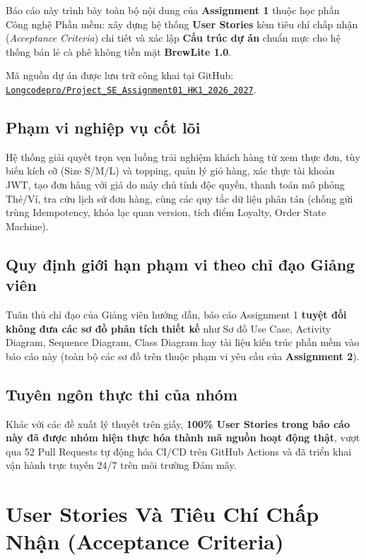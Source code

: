 \documentclass[12pt, a4paper]{article}
\newcommand{\fpath}[1]{\nolinkurl{#1}}
\begin{document}
Báo cáo này trình bày toàn bộ nội dung của \textbf{Assignment 1} thuộc học phần Công nghệ Phần mềm: xây dựng hệ thống \textbf{User Stories} kèm tiêu chí chấp nhận (\textit{Acceptance Criteria}) chi tiết và xác lập \textbf{Cấu trúc dự án} chuẩn mực cho hệ thống bán lẻ cà phê không tiền mặt \textbf{BrewLite 1.0}.

Mã nguồn dự án được lưu trữ công khai tại GitHub: \href{https://github.com/Longcodepro/Project_SE_Assignment01_HK1_2026_2027}{\fpath{Longcodepro/Project_SE_Assignment01_HK1_2026_2027}}.

\subsection{Phạm vi nghiệp vụ cốt lõi}
Hệ thống giải quyết trọn vẹn luồng trải nghiệm khách hàng từ xem thực đơn, tùy biến kích cỡ (Size S/M/L) và topping, quản lý giỏ hàng, xác thực tài khoản JWT, tạo đơn hàng với giá do máy chủ tính độc quyền, thanh toán mô phỏng Thẻ/Ví, tra cứu lịch sử đơn hàng, cùng các quy tắc dữ liệu phân tán (chống gửi trùng Idempotency, khóa lạc quan version, tích điểm Loyalty, Order State Machine).

\subsection{Quy định giới hạn phạm vi theo chỉ đạo Giảng viên}
\begin{highlightbox}
Tuân thủ chỉ đạo của Giảng viên hướng dẫn, báo cáo Assignment 1 \textbf{tuyệt đối không đưa các sơ đồ phân tích thiết kế} như Sơ đồ Use Case, Activity Diagram, Sequence Diagram, Class Diagram hay tài liệu kiến trúc phần mềm vào báo cáo này (toàn bộ các sơ đồ trên thuộc phạm vi yêu cầu của \textbf{Assignment 2}).
\end{highlightbox}

\subsection{Tuyên ngôn thực thi của nhóm}
Khác với các đề xuất lý thuyết trên giấy, \textbf{100\% User Stories trong báo cáo này đã được nhóm hiện thực hóa thành mã nguồn hoạt động thật}, vượt qua 52 Pull Requests tự động hóa CI/CD trên GitHub Actions và đã triển khai vận hành trực tuyến 24/7 trên môi trường Đám mây.

\section{User Stories Và Tiêu Chí Chấp Nhận (Acceptance Criteria)}
\end{document}
